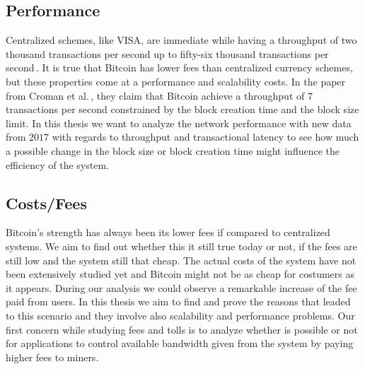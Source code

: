 \documentclass[USenglish]{uit-thesis}
\begin{document}
\subsection{Performance}
Centralized schemes, like VISA, are immediate while having a
throughput of two thousand transactions per second
up to fifty-six thousand transactions per second\,\cite{croman2016}.
It is true that Bitcoin has lower fees than centralized
currency schemes, but these properties
come at a performance and scalability costs.
In the paper from Croman et al.\,\cite{croman2016}, they
claim that Bitcoin achieve a throughput of
$7$ transactions per second constrained by the block
creation time and the block size limit.
In this thesis we want to analyze the network performance
with new data from $2017$ with regards to
throughput and transactional latency to see how
much a possible change in the block size or block creation time
might influence the efficiency of the system.

\subsection{Costs/Fees}
Bitcoin's strength has always been
its lower fees if compared
to centralized systems.
We aim to find out whether this it still true
today or not, if the fees are still
low and the system still that cheap.
The actual costs of the system
have not been extensively studied yet and Bitcoin might
not be as cheap for costumers as it appears.
During our analysis we could observe a remarkable increase
of the fee paid from users. In this thesis we aim
to find and prove the reasons that leaded to this
scenario and they involve also scalability and
performance problems.
Our first concern while studying fees and tolls
is to analyze whether is possible or not
for applications to control available
bandwidth given from the system by paying
higher fees to miners.
\end{document}
